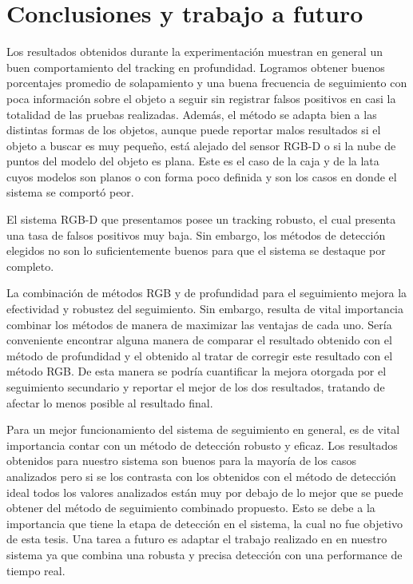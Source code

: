 \chapter{Conclusiones y trabajo a futuro}\label{chap:conclusiones}
Los resultados obtenidos durante la experimentación muestran en general un buen comportamiento del tracking en profundidad. Logramos obtener buenos porcentajes promedio de solapamiento y una buena frecuencia de seguimiento con poca información sobre el objeto a seguir sin registrar falsos positivos en casi la totalidad de las pruebas realizadas. Además, el método se adapta bien a las distintas formas de los objetos, aunque puede reportar malos resultados si el objeto a buscar es muy pequeño, está alejado del sensor RGB-D o si la nube de puntos del modelo del objeto es plana. Este es el caso de la caja y de la lata cuyos modelos son planos o con forma poco definida y son los casos en donde el sistema se comportó peor.

El sistema RGB-D que presentamos posee un tracking robusto, el cual presenta una tasa de falsos positivos muy baja. Sin embargo, los métodos de detección elegidos no son lo suficientemente buenos para que el sistema se destaque por completo.

La combinación de métodos RGB y de profundidad para el seguimiento mejora la efectividad y robustez del seguimiento. Sin embargo, resulta de vital importancia combinar los métodos de manera de maximizar las ventajas de cada uno. Sería conveniente encontrar alguna manera de comparar el resultado obtenido con el método de profundidad y el obtenido al tratar de corregir este resultado con el método RGB. De esta manera se podría cuantificar la mejora otorgada por el seguimiento secundario y reportar el mejor de los dos resultados, tratando de afectar lo menos posible al resultado final.

Para un mejor funcionamiento del sistema de seguimiento en general, es de vital importancia contar con un método de detección robusto y eficaz. Los resultados obtenidos para nuestro sistema son buenos para la mayoría de los casos analizados pero si se los contrasta con los obtenidos con el método de detección ideal todos los valores analizados están muy por debajo de lo mejor que se puede obtener del método de seguimiento combinado propuesto. Esto se debe a la importancia que tiene la etapa de detección en el sistema, la cual no fue objetivo de esta tesis. Una tarea a futuro es adaptar el trabajo realizado en \cite{hinterstoisser2010dominant} en nuestro sistema ya que combina una robusta y precisa detección con una performance de tiempo real.

